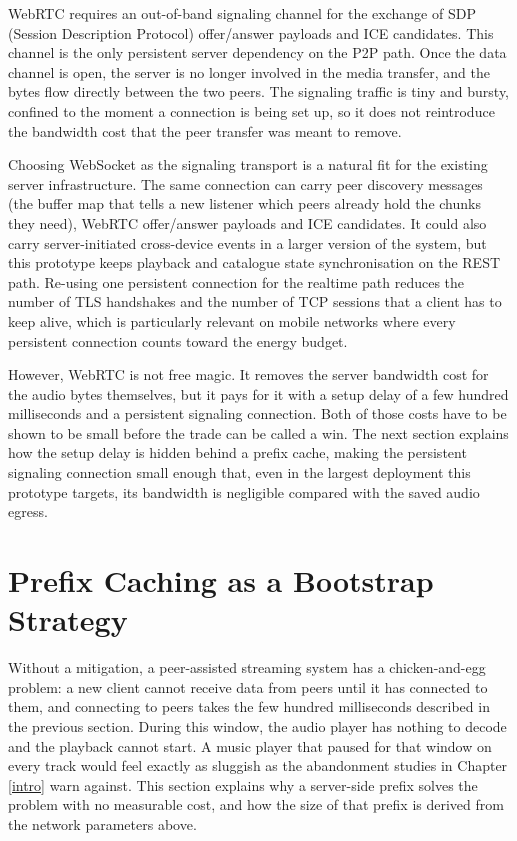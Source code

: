 \indent \par WebRTC requires an out-of-band signaling channel for the exchange of SDP (Session Description Protocol) offer/answer payloads and ICE candidates. This channel is the only persistent server dependency on the P2P path. Once the data channel is open, the server is no longer involved in the media transfer, and the bytes flow directly between the two peers. The signaling traffic is tiny and bursty, confined to the moment a connection is being set up, so it does not reintroduce the bandwidth cost that the peer transfer was meant to remove.

\par Choosing WebSocket as the signaling transport is a natural fit for the existing server infrastructure. The same connection can carry peer discovery messages (the buffer map that tells a new listener which peers already hold the chunks they need), WebRTC offer/answer payloads and ICE candidates. It could also carry server-initiated cross-device events in a larger version of the system, but this prototype keeps playback and catalogue state synchronisation on the REST path. Re-using one persistent connection for the realtime path reduces the number of TLS handshakes and the number of TCP sessions that a client has to keep alive, which is particularly relevant on mobile networks where every persistent connection counts toward the energy budget.

\indent \par However, WebRTC is not free magic. It removes the server bandwidth cost for the audio bytes themselves, but it pays for it with a setup delay of a few hundred milliseconds and a persistent signaling connection. Both of those costs have to be shown to be small before the trade can be called a win. The next section explains how the setup delay is hidden behind a prefix cache, making the persistent signaling connection small enough that, even in the largest deployment this prototype targets, its bandwidth is negligible compared with the saved audio egress.


\section{Prefix Caching as a Bootstrap Strategy}
\label{sec:prefix-theory}

\indent \par Without a mitigation, a peer-assisted streaming system has a chicken-and-egg problem: a new client cannot receive data from peers until it has connected to them, and connecting to peers takes the few hundred milliseconds described in the previous section. During this window, the audio player has nothing to decode and the playback cannot start. A music player that paused for that window on every track would feel exactly as sluggish as the abandonment studies in Chapter \ref{intro} warn against. This section explains why a server-side prefix solves the problem with no measurable cost, and how the size of that prefix is derived from the network parameters above.

